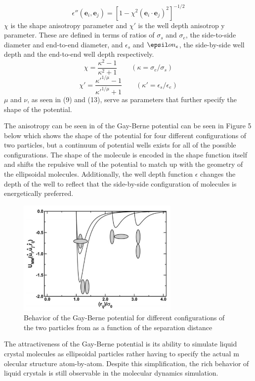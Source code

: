 \documentclass[preprint, aps]{revtex4-1}
\begin{document}
	\begin{equation} \label{o-func2}	
		\epsilon''(\mathbf{e}_i,\mathbf{e}_j) 
		= \left[ 1 - \chi^2(\mathbf{e}_i \cdot \mathbf{e}_j)^2 \right]^{-1/2}	
	\end{equation}
$\chi$ is the shape anisotropy parameter and $\chi'$ is the well depth anisotrop
y parameter. These are defined in terms of ratios of $\sigma_s$ and $\sigma_e$, 
 the side-to-side diameter and end-to-end diameter, and $\epsilon_s$ and $\epsil
on_e$, the side-by-side well depth and the end-to-end well depth respectively.
	\begin{equation} \label{chi}
		\chi = \frac{\kappa^2 - 1}{\kappa^2 + 1} 
		\qquad (\kappa = \sigma_e / \sigma_s)
	\end{equation}
	\begin{equation} \label{chi-prime}	
		\chi' = \frac{\kappa'^{1/\mu} - 1}{\kappa'^{1/\mu} + 1} 
		\qquad (\kappa' = \epsilon_s / \epsilon_e)
	\end{equation}
$\mu$ and $\nu$, as seen in (9) and (13), serve as parameters that further 
specify the shape of the potential. 

The anisotropy can be seen in of the Gay-Berne potential can be seen in Figure 5 
below which shows the shape of the potential for four different configurations 
of two particles, but a continuum of potential wells exists for all of the 
possible configurations. The shape of the molecule is encoded in the shape 
function itself and shifts the repulsive wall of the potential to match up with 
the geometry of the ellipsoidal molecules. Additionally, the well depth function 
$\epsilon$ changes the depth of the well to reflect that the side-by-side 
configuration of molecules is energetically preferred.
	\begin{figure}[!htbp]
		\centering
		\includegraphics[width=0.7\textwidth]{gb.png}
		\caption{Behavior of the Gay-Berne potential for different 
			configurations of the two particles from \cite{moreno11} as a 
			function of the separation distance}
		\label{fig:gb}
	\end{figure}
The attractiveness of the Gay-Berne potential is its ability to simulate liquid 
crystal molecules as ellipsoidal particles rather having to specify the actual m
olecular structure atom-by-atom. Despite this simplification, the rich behavior
of liquid crystals is still observable in the molecular dynamics simulation.
\end{document}
